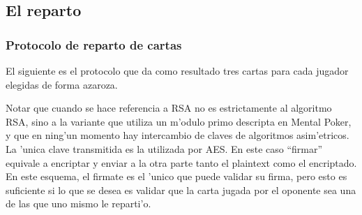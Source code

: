 \subsection{El reparto}
\subsubsection{Protocolo de reparto de cartas}
El siguiente es el protocolo que da como resultado tres cartas para cada jugador elegidas de forma azaroza.


Notar que cuando se hace referencia a RSA no es estrictamente al algoritmo RSA, sino a la variante que utiliza un m'odulo primo descripta en Mental Poker, y que en ning'un momento hay intercambio de claves de algoritmos asim'etricos. La 'unica clave transmitida es la utilizada por AES.
En este caso ``firmar'' equivale a encriptar y enviar a la otra parte tanto el plaintext como el encriptado. En este esquema, el firmate es el 'unico que puede validar su firma, pero esto es suficiente si lo que se desea es validar que la carta jugada por el oponente sea una de las que uno mismo le reparti'o.

